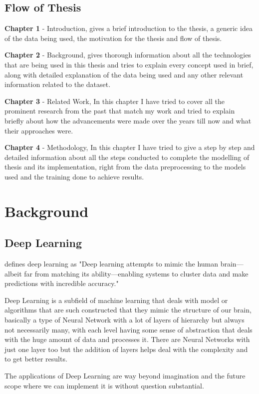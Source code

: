 \documentclass[oneside,12pt]{Classes/RoboticsLaTeX}
\begin{document}
\section{Flow of Thesis}
\textbf{Chapter 1} - Introduction, gives a brief introduction to the thesis, a generic idea of the data being used, the motivation for the thesis and flow of thesis.

\noindent
\textbf{Chapter 2} - Background, gives thorough information about all the technologies that are being used in this thesis and tries to explain every concept used in brief, along with detailed explanation of the data being used and any other relevant  information related to the dataset.

\noindent
\textbf{Chapter 3} - Related Work, In this chapter I have tried to cover all the prominent research from the past that match my work and tried to explain briefly about how the advancements were made over the years till now and what their approaches were.

\noindent
\textbf{Chapter 4} - Methodology, In this chapter I have tried to give a step by step and detailed information about all the steps conducted to complete the modelling of thesis and its implementation, right from the data preprocessing to the models used and the training done to achieve results.

\chapter{Background}
\label{chap:backg}

\section{Deep Learning}
\cite{ibm} defines deep learning as "Deep learning attempts to mimic the human brain—albeit far from matching its ability—enabling systems to cluster data and make predictions with incredible accuracy."

Deep Learning is a subfield of machine learning that deals with model or algorithms that are such constructed that they mimic the structure of our brain, basically a type of Neural Network with a lot of layers of hierarchy but always not necessarily many, with each level having some sense of abstraction that deals with the huge amount of data and processes it. There are Neural Networks with just one layer too but the addition of layers helps deal with the complexity and to get better results.

The applications of Deep Learning are way beyond imagination and the future scope where we can implement it is without question substantial.
\end{document}
